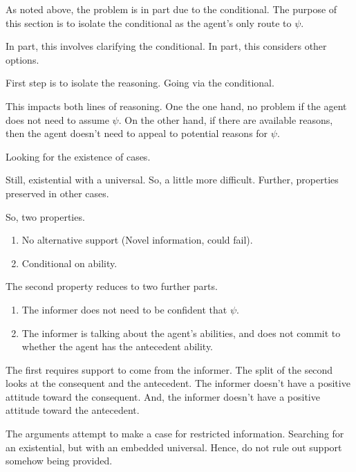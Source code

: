 \documentclass[10pt]{article}
\begin{document}
\begin{note}[Sketch]
  As noted above, the problem is in part due to the conditional.
  The purpose of this section is to isolate the conditional as the agent's only route to \(\psi\).

  In part, this involves clarifying the conditional.
  In part, this considers other options.
\end{note}

\begin{note}[Introduction]
  First step is to isolate the reasoning.
  Going via the conditional.

  This impacts both lines of reasoning.
  One the one hand, no problem if the agent does not need to assume \(\psi\).
  On the other hand, if there are available reasons, then the agent doesn't need to appeal to potential reasons for \(\psi\).

  Looking for the existence of cases.

  Still, existential with a universal.
  So, a little more difficult.
  Further, properties preserved in other cases.

  So, two properties.

  \begin{enumerate}
  \item No alternative support (Novel information, could fail).
  \item Conditional on ability.
  \end{enumerate}

  The second property reduces to two further parts.

  \begin{enumerate}
  \item The informer does not need to be confident that \(\psi\).
  \item The informer is talking about the agent's abilities, and does not commit to whether the agent has the antecedent ability.
  \end{enumerate}

  The first requires support to come from the informer.
  The split of the second looks at the consequent and the antecedent.
  The informer doesn't have a positive attitude toward the consequent.
  And, the informer doesn't have a positive attitude toward the antecedent.
\end{note}

\begin{note}
  The arguments attempt to make a case for restricted information.
  Searching for an existential, but with an embedded universal.
  Hence, do not rule out support somehow being provided.
\end{note}
\end{document}
